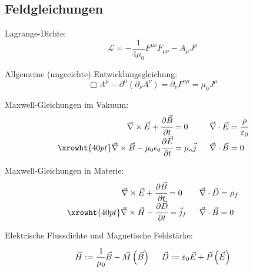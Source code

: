 \documentclass[11pt]{article}
\numberwithin{equation}{section}
\begin{document}
		\subsection{Feldgleichungen}
      Lagrange-Dichte:
      \begin{equation}
        \mathcal{L} = -\frac{1}{4\mu_0}F^{\mu\nu} F_{\mu\nu} - A_\mu J^\mu
      \end{equation}

      Allgemeine (ungeeichte) Entwicklungsgleichung:
      \begin{equation}
        \Box A^\mu-\partial^\mu\left(\partial_\nu A^\nu\right) = \partial_\nu F^{\nu\mu} =  \mu_0 J^\mu
      \end{equation}

			Maxwell-Gleichungen im Vakuum:
			\begin{equation}
			\begin{array}{rl}
				\vec{\nabla}\times \vec{E} + \cfrac{\partial\vec{B}}{\partial t} = 0 \phantom{\mu_0}
				&\;\; \vec{\nabla}\cdot\vec{E} = \cfrac{\rho}{\varepsilon_0} \\ \xrowht{40pt}
				\vec{\nabla}\times\vec{B} - \mu_0 \epsilon_0 \cfrac{\partial \vec{E}}{\partial t} = \mu_o\vec{j}
				&\;\; \vec{\nabla}\cdot\vec{B} = 0 \\
			\end{array}
			\end{equation}

			Maxwell-Gleichungen in Materie:
			\begin{equation}
			\begin{array}{rl}
				\vec{\nabla}\times \vec{E} + \cfrac{\partial\vec{B}}{\partial t} = 0 \phantom{_f}
				&\;\; \vec{\nabla}\cdot\vec{D} = \rho_f\\ \xrowht{40pt}
				\vec{\nabla}\times\vec{H} - \cfrac{\partial \vec{D}}{\partial t} = \vec{j}_f
				&\;\; \vec{\nabla}\cdot\vec{B} = 0 \\
			\end{array}
			\end{equation}

			Elektrische Flussdichte und Magnetische Feldstärke:
			\begin{equation} \label{eq:flussdichte-feldstärke}
  			\begin{array}{cc}
  				\vec{H} := \cfrac{1}{\mu_0}\Vec{B} - \vec{M}\left(\vec{B}\right)
  				&\;\; \vec{D} := \varepsilon_0\vec{E} + \vec{P}\left(\vec{E}\right)
  			\end{array}
			\end{equation}
\end{document}
